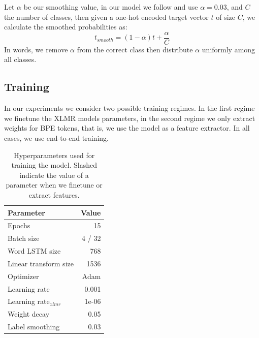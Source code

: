 \documentclass[11pt]{article}
\newcommand\jp[1]{(\textbf{JP:} #1)}
\newcommand\citep{\cite}
\begin{document}
         Let $\alpha$ be our smoothing value, in our model we follow
     \citep{kondratyukstraka} and use $\alpha = 0.03$, and $C$ the
     number of classes, then given a one-hot encoded target vector $t$
     of size $C$, we calculate the smoothed probabilities as:
    \begin{equation}
        t_{smooth} = (1-\alpha)t + \frac{\alpha}{C}
    \end{equation}
    In words, we remove $\alpha$ from the correct class then
    distribute $\alpha$ uniformly among all classes.
     \subsection{Training}

	
     In our experiments we consider two possible training regimes. In
     the first regime we finetune the XLMR models parameters, in the
     second regime we only extract weights for BPE tokens, that is, we
     use the model as a feature extractor. In all cases, we use
     end-to-end training.

    	\begin{table}
		\centering
		\begin{tabular}{lr} \\
			Parameter & Value \\
			\hline
			Epochs & 15 \\
			Batch size & 4 / 32 \\
            Word LSTM size & 768 \\
            Linear transform size & 1536 \\
			Optimizer & Adam \\
			Learning rate & 0.001 \\
			Learning rate$_{xlmr}$ & 1e-06 \\
            Weight decay & 0.05 \\
			Label smoothing & 0.03 \\
		\end{tabular}
    		\caption{\label{tab:parameters} Hyperparameters used for
     training the model. Slashed indicate the value of a parameter
     when we finetune or extract features.}
	\end{table}
     
\end{document}
